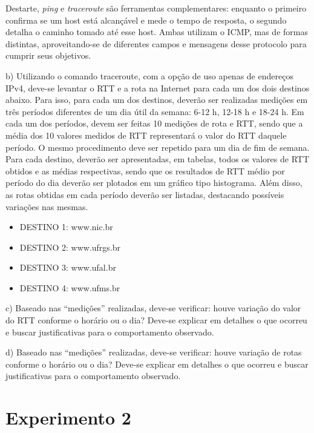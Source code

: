 Destarte, \textit{ping} e \textit{traceroute} são ferramentas complementares: enquanto o primeiro confirma se um host está alcançável e mede o tempo de resposta, o segundo detalha o caminho tomado até esse host. Ambas utilizam o ICMP, mas de formas distintas, aproveitando-se de diferentes campos e mensagens desse protocolo para cumprir seus objetivos.

\newpage

b) Utilizando o comando traceroute, com a opção de uso apenas de endereços IPv4, deve-se levantar o RTT e a rota na Internet para cada um dos dois destinos abaixo. Para isso, para cada um dos destinos, deverão ser realizadas medições em três períodos diferentes de um dia útil da semana: 6-12 h, 12-18 h e 18-24 h. Em cada um dos períodos, devem ser feitas 10 medições de rota e RTT, sendo que a média dos 10 valores medidos de RTT representará o valor do RTT daquele período. O mesmo procedimento deve ser repetido para um dia de fim de semana. Para cada destino, deverão ser apresentadas, em tabelas, todos os valores de RTT obtidos e as médias respectivas, sendo que os resultados de RTT médio por período do dia deverão ser plotados em um gráfico tipo histograma. Além disso, as rotas obtidas em cada período deverão ser listadas, destacando possíveis variações nas mesmas.

\begin{itemize}
  \item DESTINO 1: www.nic.br
  \item DESTINO 2: www.ufrgs.br
  \item DESTINO 3: www.ufal.br
  \item DESTINO 4: www.ufms.br
\end{itemize}

\bigskip

c) Baseado nas “medições” realizadas, deve-se verificar: houve variação do valor do RTT conforme o horário ou o dia? Deve-se explicar em detalhes o que ocorreu e buscar justificativas para o comportamento observado.

\bigskip

d) Baseado nas “medições” realizadas, deve-se verificar: houve variação de rotas conforme o horário ou o dia? Deve-se explicar em detalhes o que ocorreu e buscar justificativas para o comportamento observado.


\newpage %

\section{Experimento 2}
\label{sec:experimento2}

